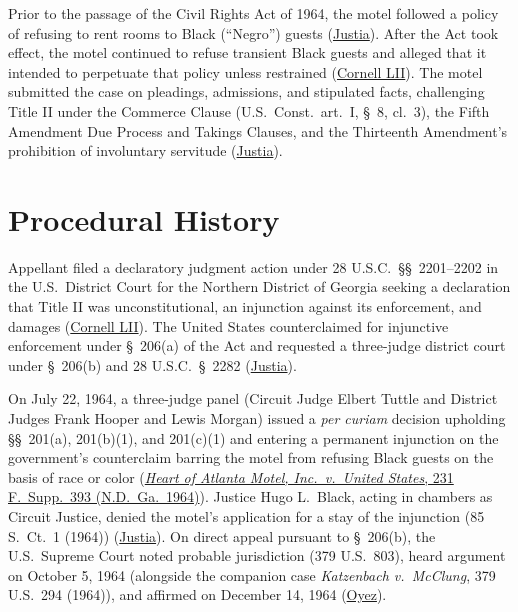 \documentclass[12pt]{article}
\begin{document}
Prior to the passage of the Civil Rights Act of 1964, the motel followed a policy of refusing to rent rooms to Black (``Negro'') guests (\href{https://supreme.justia.com/cases/federal/us/379/241/}{Justia}). After the Act took effect, the motel continued to refuse transient Black guests and alleged that it intended to perpetuate that policy unless restrained (\href{https://www.law.cornell.edu/supremecourt/text/379/241}{Cornell LII}). The motel submitted the case on pleadings, admissions, and stipulated facts, challenging Title II under the Commerce Clause (U.S.\ Const.\ art.\ I, \S~8, cl.\ 3), the Fifth Amendment Due Process and Takings Clauses, and the Thirteenth Amendment's prohibition of involuntary servitude (\href{https://supreme.justia.com/cases/federal/us/379/241/}{Justia}).

\section{Procedural History}
Appellant filed a declaratory judgment action under 28 U.S.C.\ \S\S~2201--2202 in the U.S.\ District Court for the Northern District of Georgia seeking a declaration that Title II was unconstitutional, an injunction against its enforcement, and damages (\href{https://www.law.cornell.edu/supremecourt/text/379/241}{Cornell LII}). The United States counterclaimed for injunctive enforcement under \S~206(a) of the Act and requested a three-judge district court under \S~206(b) and 28 U.S.C.\ \S~2282 (\href{https://supreme.justia.com/cases/federal/us/379/241/}{Justia}).

On July 22, 1964, a three-judge panel (Circuit Judge Elbert Tuttle and District Judges Frank Hooper and Lewis Morgan) issued a \textit{per curiam} decision upholding \S\S~201(a), 201(b)(1), and 201(c)(1) and entering a permanent injunction on the government's counterclaim barring the motel from refusing Black guests on the basis of race or color (\href{https://law.justia.com/cases/federal/district-courts/FSupp/231/393/1444943/}{\textit{Heart of Atlanta Motel, Inc.\ v.\ United States}, 231 F.\ Supp.\ 393 (N.D.\ Ga.\ 1964)}). Justice Hugo L.\ Black, acting in chambers as Circuit Justice, denied the motel's application for a stay of the injunction (85 S.\ Ct.\ 1 (1964)) (\href{https://supreme.justia.com/cases/federal/us/379/241/}{Justia}). On direct appeal pursuant to \S~206(b), the U.S.\ Supreme Court noted probable jurisdiction (379 U.S.\ 803), heard argument on October 5, 1964 (alongside the companion case \textit{Katzenbach v.\ McClung}, 379 U.S.\ 294 (1964)), and affirmed on December 14, 1964 (\href{https://www.oyez.org/cases/1964/515}{Oyez}).
\end{document}
